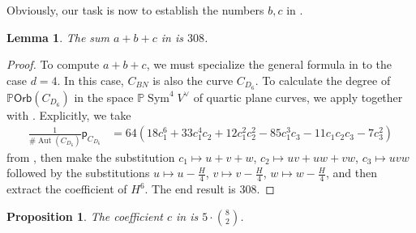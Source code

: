 \documentclass[12 pt, reqno]{amsart}
\newtheorem{prop}[thm]{Proposition}
\newtheorem{lem}[thm]{Lemma}
\theoremstyle{definition}
\newcommand{\on}{\operatorname}
\newcommand{\mb}{\mathbb}
\renewcommand{\P}{\mb{P}}
\newcommand{\Orb}{\mathsf{Orb}}
\newcommand{\p}{\mathsf{p}}
\begin{document}
Obviously, our task is now to establish the numbers $b,c$ in
.

\begin{lem}
\label{abcsum}
The sum $a+b+c$ in  is $308$.
\end{lem}

\begin{proof}
  To compute $a+b+c$, we must specialize the general formula in
   to the case $d=4$. In this case,
  $C_{BN}$ is also the curve $C_{D_6}$. To calculate the degree of
  $\P \Orb(C_{D_6})$ in the space $\mb{P}\on{Sym}^{4}V^{\vee}$ of
  quartic plane curves, we apply  together with
  . Explicitly, we take
\begin{align*}
  \frac{1}{\#\on{Aut}(C_{D_6})}\p_{C_{D_6}}&= 64 (18 c_1^6 + 33 c_1^4 c_2 + 12 c_1^2 c_2^2 - 85 c_1^3 c_3 - 11 c_1 c_2 c_3 - 
                                             7 c_3^2)
\end{align*}
from , then make the substitution $c_1\mapsto u+v+w$,
$c_2\mapsto uv+uw+vw$, $c_3\mapsto uvw$ followed by the substitutions
$u\mapsto u-\frac{H}{4}$, $v\mapsto v-\frac{H}{4}$,
$w\mapsto w-\frac{H}{4}$, and then extract the coefficient of
$H^6$. The end result is $308$.
\end{proof}

\begin{prop}
\label{5cubics}
The coefficient $c$ in  is
$5 \cdot {8 \choose 2}$.
\end{prop}
\end{document}
